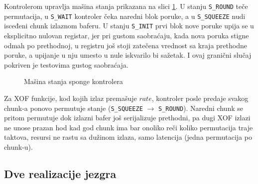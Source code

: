 Kontrolerom upravlja mašina stanja prikazana na slici \ref{fig:sha3_sponge_fsm}. U stanju \texttt{S\_ROUND} teče permutacija, u \texttt{S\_WAIT} kontroler čeka naredni blok poruke, a u \texttt{S\_SQUEEZE} nudi isceđeni chunk izlaznom baferu. U stanju \texttt{S\_INIT} prvi blok nove poruke upija se u eksplicitno nulovan registar, jer pri gustom saobraćaju, kada nova poruka stigne odmah po prethodnoj, u registru još stoji zatečena vrednost sa kraja prethodne poruke, a upijanje u nju umesto u nule iskvarilo bi sažetak. I ovaj granični slučaj pokriven je testovima gustog saobraćaja.

\begin{figure}[H]
\centering
{}
\caption{Mašina stanja sponge kontrolera}
\label{fig:sha3_sponge_fsm}
\end{figure}

Za XOF funkcije, kod kojih izlaz premašuje $rate$, kontroler posle predaje svakog chunk-a ponovo permutuje stanje (\texttt{S\_SQUEEZE} $\to$ \texttt{S\_ROUND}). Naredni chunk se pritom permutuje dok izlazni bafer još serijalizuje prethodni, pa dugi XOF izlazi ne unose prazan hod kad god chunk ima bar onoliko reči koliko permutacija traje taktova, resursi ne rastu sa dužinom izlaza, samo latencija (jedna permutacija po chunk-u).

\subsection{Dve realizacije jezgra}
\label{subsec:hw_sha3_dve}

